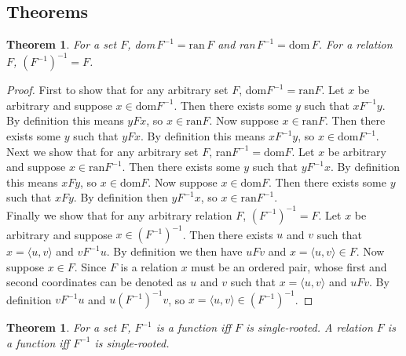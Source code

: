 \documentclass{report}
\newtheorem{theorem}[theo]{Theorem}
\begin{document}
\subsection{Theorems}
\begin{theorem}\label{theorems0}
For a set $F$, dom$\,F^{-1}=\text{ran}\,F$ and ran$\,F^{-1}=\text{dom}\,F$. For a relation $F$, $(F^{-1})^{-1}=F$.
\end{theorem}
\begin{proof}
First to show that for any arbitrary set $F$, dom$F^{-1}=\text{ran}F$. Let $x$ be arbitrary and suppose $x\in\text{dom}F^{-1}$. Then there exists some $y$ such that $xF^{-1}y$. By definition
this means $yFx$, so $x\in\text{ran}F$. Now suppose $x\in\text{ran}F$. Then there exists some $y$ such that $yFx$. By definition this means $xF^{-1}y$, so $x\in\text{dom}F^{-1}$.\\
\indent Next we show that for any arbitrary set $F$, ran$F^{-1}=\text{dom}F$. Let $x$ be arbitrary and suppose $x\in\text{ran}F^{-1}$. Then there exists some $y$ such that $yF^{-1}x$. 
By definition this means $xFy$, so $x\in\text{dom}F$. Now suppose $x\in\text{dom}F$. Then there exists some $y$ such that $xFy$. By definition then $yF^{-1}x$, so $x\in\text{ran}F^{-1}$.\\
\indent Finally we show that for any arbitrary relation $F$, $(F^{-1})^{-1}=F$. Let $x$ be arbitrary and suppose $x\in(F^{-1})^{-1}$. Then there exists $u$ and $v$ such that $x=\langle u,v\rangle$
and $vF^{-1}u$. By definition we then have $uFv$ and $x=\langle u,v\rangle\in F$. Now suppose $x\in F$. Since $F$ is a relation $x$ must be an ordered pair, whose first and second coordinates 
can be denoted as $u$ and $v$ such that $x=\langle u,v\rangle$ and $uFv$. By definition $vF^{-1}u$ and $u(F^{-1})^{-1}v$, so $x=\langle u,v\rangle\in(F^{-1})^{-1}$.
\end{proof}
\begin{theorem}\label{theorems3}
For a set $F$, $F^{-1}$ is a function iff $F$ is single-rooted. A relation $F$ is a function iff $F^{-1}$ is single-rooted.
\end{theorem}
\end{document}
